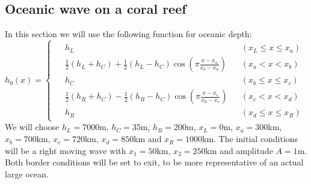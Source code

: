 
\subsection{Oceanic wave on a coral reef}

In this section we will use the following function for oceanic depth:
\begin{equation}
    h_0(x) = \begin{cases}
        \begin{aligned}
            &\scriptstyle{h_L} &&\scriptstyle{(x_L \le x \le x_a)} \\
            &\scriptstyle{\frac{1}{2}(h_L + h_C) + \frac{1}{2}(h_L - h_C) \cos \left( \pi \frac{x-x_a}{x_b-x_a} \right)} &&\scriptstyle{(x_a < x < x_b)} \\
            &\scriptstyle{h_C} &&\scriptstyle{(x_b \le x \le x_c)} \\
            &\scriptstyle{\frac{1}{2}(h_R + h_C) - \frac{1}{2}(h_R - h_C) \cos \left( \pi \frac{x-x_c}{x_d-x_c} \right)} &&\scriptstyle{(x_c < x < x_d)} \\
            &\scriptstyle{h_R} &&\scriptstyle{(x_d \le x \le x_R)}
        \end{aligned}
    \end{cases}
\end{equation}
We will choose \(h_L = 7000\)m, \(h_C = 35\)m, \(h_R = 200\)m, \(x_L = 0\)m, \(x_a = 300\)km, \(x_b = 700\)km, \(x_c = 720\)km, \(x_d = 850\)km and \(x_R = 1000\)km. The initial conditions will be a right moving wave with \(x_1 = 50\)km, \(x_2 = 250\)km and amplitude \(A = 1\)m. Both border conditions will be set to exit, to be more representative of an actual large ocean.
